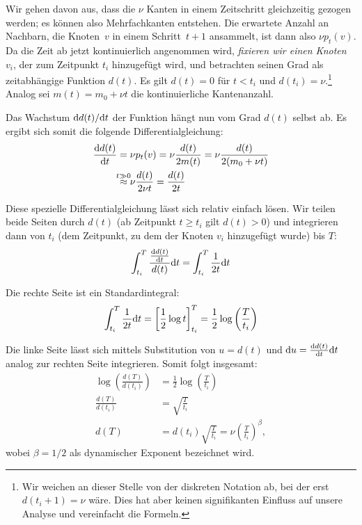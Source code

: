 Wir gehen davon aus, dass die $\nu$ Kanten in einem Zeitschritt gleichzeitig gezogen werden;
es können also Mehrfachkanten entstehen.
Die erwartete Anzahl an Nachbarn, die Knoten~$v$ in einem Schritt~$t+1$ ansammelt, ist dann also $\nu p_t(v)$.
Da die Zeit ab jetzt kontinuierlich angenommen wird, \emph{fixieren wir einen Knoten $v_i$}, der zum Zeitpunkt $t_i$ hinzugefügt wird, und betrachten seinen Grad als zeitabhängige Funktion $d(t)$.
Es gilt $d(t) = 0$ für $t < t_i$ und $d(t_i) = \nu$.\footnote{
    Wir weichen an dieser Stelle von der diskreten Notation ab, bei der erst $d(t_i + 1) = \nu$ wäre.
    Dies hat aber keinen signifikanten Einfluss auf unsere Analyse und vereinfacht die Formeln.
}
Analog sei $m(t) = m_0 + \nu t$ die kontinuierliche Kantenanzahl.

Das Wachstum $\text d d(t) / \text d t$ der Funktion hängt nun vom Grad $d(t)$ selbst ab.
Es ergibt sich somit die folgende Differentialgleichung:
\begin{align}
    \frac{\intd d(t)}{\intd t}
     & = \nu p_t(v)
    = \nu \frac{d(t)}{2 m(t)}
    = \nu \frac{d(t)}{2(m_0 + \nu t)}                                         \\
     & \stackrel{\mathclap{t \gg 0}}{\approx} \nu \frac{d(t)}{2 \nu t} = \frac{d(t)}{2t}
\end{align}

Diese spezielle Differentialgleichung lässt sich relativ einfach lösen.
Wir teilen beide Seiten durch $d(t)$ (ab Zeitpunkt $t \ge t_i$ gilt $d(t) > 0$) und integrieren dann von $t_i$ (dem Zeitpunkt, zu dem der Knoten $v_i$ hinzugefügt wurde) bis $T$:
\begin{equation}
    \int_{t_i}^T  \frac{\frac{\text d d(t)}{\text d t}}{d(t)} \text d t = \int_{t_i}^T \frac{1}{2t} \text d t
\end{equation}

\noindent
Die rechte Seite ist ein Standardintegral:
\begin{equation}
    \int_{t_i}^T \frac{1}{2t} \text d t = \left[ \frac 1 2 \log t \right]_{t_i}^T = \frac 1 2 \log\left(\frac{T}{t_i}\right)
\end{equation}

Die linke Seite lässt sich mittels Substitution von $u = d(t)$ und $\text d u = \frac{\text d d(t)}{\text d t} \text d t$ analog zur rechten Seite integrieren.
Somit folgt insgesamt:
\begin{align}
    \log\left(\frac{d(T)}{d(t_i)}\right) & = \frac 1 2 \log \left(\frac{T}{t_i}\right)                             \\
    \frac{d(T)}{d(t_i)}                  & = \sqrt{\frac{T}{t_i}}                                                  \\
    d(T)                                 & = d(t_i) \sqrt{\frac{T}{t_i}} = \nu \left( \frac{T}{t_i} \right)^\beta,
\end{align}
wobei $\beta = 1/2$ als  dynamischer Exponent bezeichnet wird.

